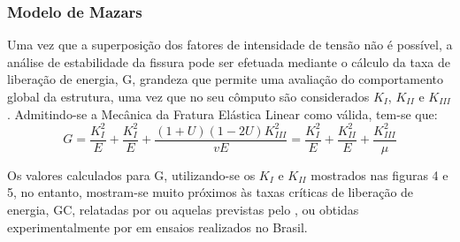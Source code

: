 \documentclass[12pt, a4paper, oneside]{article}
\begin{document}
\subsubsection{Modelo de Mazars}
\vspace{\parskip}
Uma vez que a superposição dos fatores de intensidade de tensão não é possível, a análise de estabilidade da fissura pode ser efetuada mediante o cálculo da taxa de liberação de energia, G, grandeza que permite uma avaliação do comportamento global da estrutura, uma vez que no seu cômputo são considerados $K_I$, $K_{II}$ e $K_{III}$. Admitindo-se a Mecânica da Fratura Elástica Linear como válida, tem-se que:
\vspace{\parskip}
\begin{equation}\label{eqn_01}
{ G } = \frac {   { K } _ {   { I } } ^ { 2 } } {   { E } } + \frac {   { K } _ {   { I } } ^ { 2 } } {   { E } } + \frac { ( 1 +   { U } ) ( 1 - 2   { U } )   { K } _ {   { III } } ^ { 2 } } {   { vE } } = \frac {   { K } _ {   { I } } ^ { 2 } } {   { E } } + \frac {   { K } _ {   { II } } ^ { 2 } } {   { E } } + \frac {   { K } _ {   { III } } ^ { 2 } } { \mu }
\end{equation}

Os valores calculados para G, utilizando-se os $K_I$ e $K_{II}$ mostrados nas figuras 4 e 5, no entanto, mostram-se muito próximos às taxas críticas de liberação de energia, GC, relatadas por  ou aquelas previstas pelo , ou obtidas experimentalmente por  em ensaios realizados no Brasil. 
\end{document}
